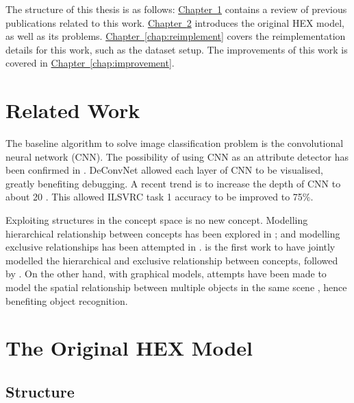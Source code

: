 \documentclass[11pt,a4paper]{book}
\begin{document}
The structure of this thesis is as follows: \hyperref[chap:related]{Chapter~\ref{chap:related}} contains a review of previous publications related to this work. \hyperref[chap:original]{Chapter~\ref{chap:original}} introduces the original HEX model, as well as its problems. \hyperref[chap:reimplement]{Chapter~\ref{chap:reimplement}} covers the reimplementation details for this work, such as the dataset setup. The improvements of this work is covered in \hyperref[chap:improvement]{Chapter~\ref{chap:improvement}}.

\chapter{Related Work}
\label{chap:related}

The baseline algorithm to solve image classification problem is the convolutional neural network (CNN). The possibility of using CNN as an attribute detector has been confirmed in \cite{razavian2014cnn}. DeConvNet \cite{zeiler2014visualizing} allowed each layer of CNN to be visualised, greatly benefiting debugging. A recent trend is to increase the depth of CNN to about 20 \cite{szegedy2014going, simonyan2014very}. This allowed ILSVRC task 1 accuracy to be improved to 75\%.

Exploiting structures in the concept space is no new concept. Modelling hierarchical relationship between concepts has been explored in \cite{marszalek2007semantic, ordonez2013large}; and modelling exclusive relationships has been attempted in \cite{chen2011multi}. \cite{deng2014large} is the first work to have jointly modelled the hierarchical and exclusive relationship between concepts, followed by \cite{ding2015probabilistic}. On the other hand, with graphical models, attempts have been made to model the spatial relationship between multiple objects in the same scene \cite{choi2012tree}, hence benefiting object recognition.

\chapter{The Original HEX Model}
\label{chap:original}
\section{Structure}
\end{document}

